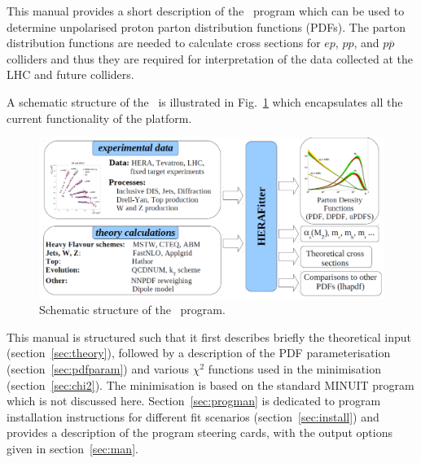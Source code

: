 \label{section:introduction}
This manual provides a short description of the \fitter\ program 
which can be used to determine unpolarised proton parton distribution functions 
(PDFs). 
The parton distribution functions are needed to calculate cross sections
for $ep$, $pp$, and $p\overline{p}$ colliders and thus they are required for interpretation
of the data collected at the LHC and future colliders.

A schematic structure of the \fitter\ is illustrated in Fig.~\ref{fig:flow} which encapsulates all the current functionality of the platform.
\begin{figure}[!ht]
\begin{center}
\includegraphics[width=0.75\linewidth]{figures/flow.pdf}
\caption{Schematic structure of the \fitter\ program.}
\end{center}
\label{fig:flow}
\end{figure}

This manual is structured such that it first describes briefly the
 theoretical input (section~\ref{sec:theory}), followed by a description of the
PDF parameterisation (section~\ref{sec:pdfparam}) and various $\chi^2$ functions used in the minimisation (section~\ref{sec:chi2}). The minimisation is based on the standard MINUIT program \cite{MINUIT} which is not discussed here.
Section~\ref{sec:progman} is dedicated to program installation instructions for different fit scenarios (section~\ref{sec:install}) and provides a description of the program steering cards, with the output options given in section~\ref{sec:man}.
